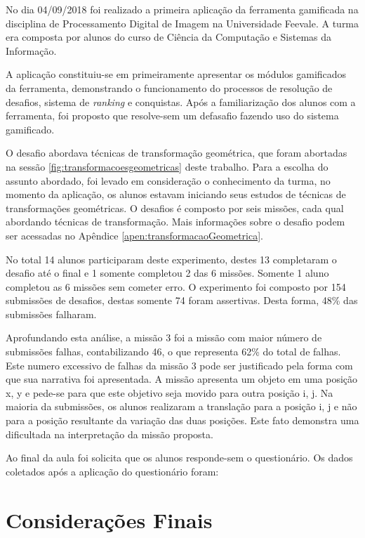 \documentclass[
	12pt,				%
	oneside,			%
	a4paper,			%
	english,			%
	french,				%
	spanish,			%
	brazil,				%
	]{abntex2}
\begin{document}
No dia 04/09/2018 foi realizado a primeira aplicação da ferramenta gamificada na disciplina de Processamento Digital de Imagem na Universidade Feevale. A turma era composta por alunos do curso de Ciência da Computação e Sistemas da Informação.

A aplicação constituiu-se em primeiramente apresentar os módulos gamificados da ferramenta, demonstrando o funcionamento do processos de resolução de desafios, sistema de \textit{ranking} e conquistas. Após a familiarização dos alunos com a ferramenta, foi proposto que resolve-sem um defasafio fazendo uso do sistema gamificado.

O desafio abordava técnicas de transformação geométrica, que foram abortadas na sessão \ref{fig:transformacoesgeometricas} deste trabalho. Para a escolha do assunto abordado, foi levado em consideração o conhecimento da turma, no momento da aplicação, os alunos estavam iniciando seus estudos de técnicas de transformações geométricas. O desafios é composto por seis missões, cada qual abordando técnicas de transformação. Mais informações sobre o desafio podem ser acessadas no Apêndice \ref{apen:transformacaoGeometrica}.

No total 14 alunos participaram deste experimento, destes 13 completaram o desafio até o final e 1 somente completou 2 das 6 missões. Somente 1 aluno completou as 6 missões sem cometer erro. O experimento foi composto por 154 submissões de desafios, destas somente 74 foram assertivas. Desta forma, 48\% das submissões falharam.

Aprofundando esta análise, a missão 3 foi a missão com maior número de submissões falhas, contabilizando 46, o que representa 62\% do total de falhas. Este numero excessivo de falhas da missão 3 pode ser justificado pela forma com que sua narrativa foi apresentada. A missão apresenta um objeto em uma posição x, y e pede-se para que este objetivo seja movido para outra posição i, j. Na maioria da submissões, os alunos realizaram a translação para a posição i, j e não para a posição resultante da variação das duas posições. Este fato demonstra uma dificultada na interpretação da missão proposta.

Ao final da aula foi solicita que os alunos responde-sem o questionário. Os dados coletados após a aplicação do questionário foram:

% 

\chapter[Considerações Finais]{Considerações Finais}
\end{document}
